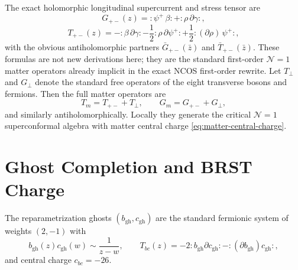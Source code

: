\documentclass[11pt]{article}
\newcommand{\mc}[1]{\mathcal{#1}}
\newcommand{\gh}{\mathrm{gh}}
\begin{document}
The exact holomorphic longitudinal supercurrent and stress tensor are
\begin{equation}\label{eq:longitudinal-supercurrent}
G_{+-}(z)=:\!\psi^+\,\beta\!:+:\!\rho\,\partial\gamma\!:,
\end{equation}
\begin{equation}\label{eq:longitudinal-stress}
T_{+-}(z)=-:\!\beta\,\partial\gamma\!:
-\frac12:\!\rho\,\partial\psi^+\!:
+\frac12:\!(\partial\rho)\,\psi^+\!:,
\end{equation}
with the obvious antiholomorphic partners $\bar G_{+-}(\bar z)$ and $\bar T_{+-}(\bar z)$. These formulas are not new derivations here; they are the standard first-order $\mc N=1$ matter operators already implicit in the exact NCOS first-order rewrite. Let $T_\perp$ and $G_\perp$ denote the standard free operators of the eight transverse bosons and fermions. Then the full matter operators are
\begin{equation}\label{eq:full-matter-operators}
T_m=T_{+-}+T_\perp,
\qquad
G_m=G_{+-}+G_\perp,
\end{equation}
and similarly antiholomorphically. Locally they generate the critical $\mc N=1$ superconformal algebra with matter central charge \eqref{eq:matter-central-charge}.

\section{Ghost Completion and BRST Charge}
The reparametrization ghosts $(b_{\gh},c_{\gh})$ are the standard fermionic system of weights $(2,-1)$ with
\begin{equation}\label{eq:bc-ope}
b_{\gh}(z)c_{\gh}(w)\sim \frac{1}{z-w},
\qquad
T_{bc}(z)=-2:\!b_{\gh}\partial c_{\gh}\!:-:\!(\partial b_{\gh})c_{\gh}\!:,
\end{equation}
and central charge $c_{bc}=-26$.
\end{document}
